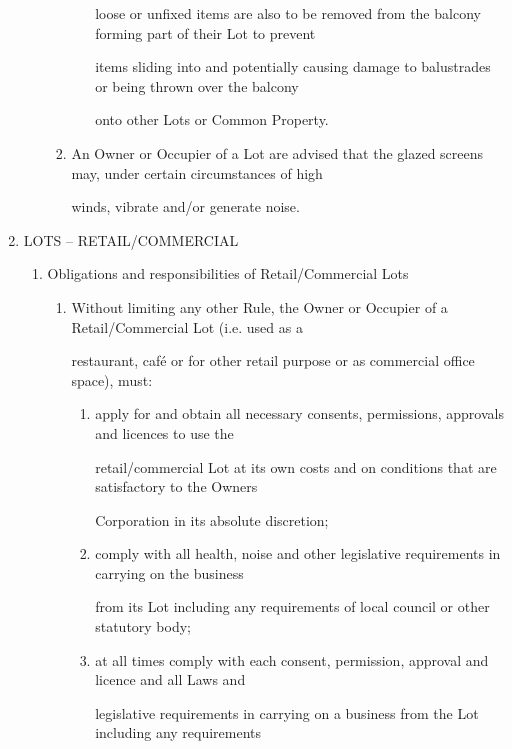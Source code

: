 \documentclass{article}
\begin{document}
\begin{enumerate}[label=\arabic*.]
\begin{enumerate}[label=\arabic{enumi}.\arabic*.]
\begin{enumerate}[label=(\arabic*)]
\begin{enumerate}[label=(\alph*)]
loose or unfixed items are also to be removed from the balcony forming part of their Lot to prevent 

items sliding into and potentially causing damage to balustrades or being thrown over the balcony 

onto other Lots or Common Property. 

\end{enumerate}
\item  An Owner or Occupier of a Lot are advised that the glazed screens may, under certain circumstances of high 

winds, vibrate and/or generate noise. 

\end{enumerate}
\end{enumerate}
\item  LOTS – RETAIL/COMMERCIAL 

\begin{enumerate}[label=\arabic{enumi}.\arabic*.]
\item  Obligations and responsibilities of Retail/Commercial Lots 

\begin{enumerate}[label=(\arabic*)]
\item  Without limiting any other Rule, the Owner or Occupier of a Retail/Commercial Lot (i.e. used as a 

restaurant, café or for other retail purpose or as commercial office space), must: 

\begin{enumerate}[label=(\alph*)]
\item  apply for and obtain all necessary consents, permissions, approvals and licences to use the 

retail/commercial Lot at its own costs and on conditions that are satisfactory to the Owners 

Corporation in its absolute discretion; 

\item  comply with all health, noise and other legislative requirements in carrying on the business 

from its Lot including any requirements of local council or other statutory body; 

\item  at all times comply with each consent, permission, approval and licence and all Laws and 

legislative requirements in carrying on a business from the Lot including any requirements 


\end{enumerate}
\end{enumerate}
\end{enumerate}
\end{enumerate}
\end{document}

